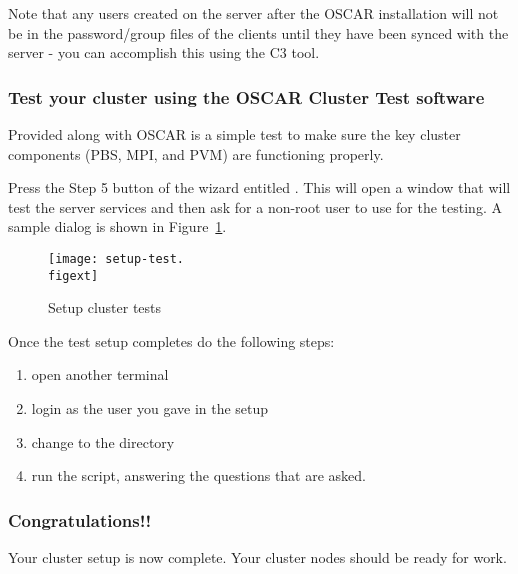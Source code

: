   Note that any users created on the server after the OSCAR
  installation will not be in the password/group files of the clients
  until they have been synced with the server - you can accomplish
  this using the C3  tool.


\subsubsection{Test your cluster using the OSCAR Cluster Test
  software}
            
Provided along with OSCAR is a simple test to make sure the key
cluster components (PBS, MPI, and PVM) are functioning properly. 

Press the Step 5 button of the wizard entitled . This will open a window that will test 
 the server services and then ask for a non-root user to use for the
 testing. A sample dialog is shown in Figure~\ref{fig:detailed-setup-test}.


\begin{figure}[htbp]
  \begin{center}
    \texttt{[image: setup-test.\\figext]}
    \caption{Setup cluster tests}
    \label{fig:detailed-setup-test}
  \end{center}
\end{figure}
 
 Once the test setup completes do the following steps:
\begin{enumerate}
 \item open another terminal 
 \item login as the user you gave in the setup
 \item change to the  directory
 \item run the  script, answering the questions
 that are asked.
\end{enumerate}

\subsubsection{Congratulations!!}

Your cluster setup is now complete. Your cluster nodes should
be ready for work.
